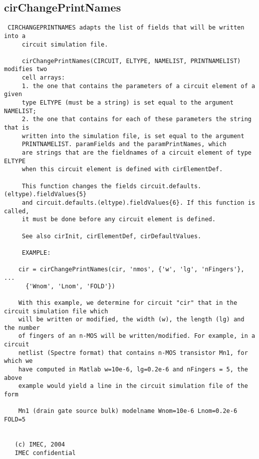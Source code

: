 \subsection{cirChangePrintNames}
\label{sec:cirChangePrintNames}
\begin{verbatim}
 CIRCHANGEPRINTNAMES adapts the list of fields that will be written into a 
     circuit simulation file.
 
     cirChangePrintNames(CIRCUIT, ELTYPE, NAMELIST, PRINTNAMELIST) modifies two
     cell arrays:
     1. the one that contains the parameters of a circuit element of a given
     type ELTYPE (must be a string) is set equal to the argument NAMELIST;
     2. the one that contains for each of these parameters the string that is
     written into the simulation file, is set equal to the argument
     PRINTNAMELIST. paramFields and the paramPrintNames, which
     are strings that are the fieldnames of a circuit element of type ELTYPE
     when this circuit element is defined with cirElementDef.
 
     This function changes the fields circuit.defaults.(eltype).fieldValues{5}
     and circuit.defaults.(eltype).fieldValues{6}. If this function is called,
     it must be done before any circuit element is defined.
 
     See also cirInit, cirElementDef, cirDefaultValues. 
 
     EXAMPLE:
     
    cir = cirChangePrintNames(cir, 'nmos', {'w', 'lg', 'nFingers'}, ...
      {'Wnom', 'Lnom', 'FOLD'})
 
    With this example, we determine for circuit "cir" that in the circuit simulation file which
    will be written or modified, the width (w), the length (lg) and the number
    of fingers of an n-MOS will be written/modified. For example, in a circuit
    netlist (Spectre format) that contains n-MOS transistor Mn1, for which we
    have computed in Matlab w=10e-6, lg=0.2e-6 and nFingers = 5, the above
    example would yield a line in the circuit simulation file of the form
 
    Mn1 (drain gate source bulk) modelname Wnom=10e-6 Lnom=0.2e-6 FOLD=5
 
 
   (c) IMEC, 2004
   IMEC confidential 
 

\end{verbatim}

\newpage
